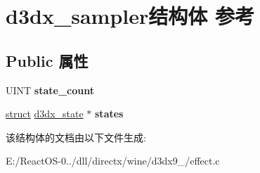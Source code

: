\hypertarget{structd3dx__sampler}{}\section{d3dx\+\_\+sampler结构体 参考}
\label{structd3dx__sampler}
\subsection*{Public 属性}
\begin{DoxyCompactItemize}
\item 
\mbox{\label{structd3dx__sampler_a94d562f4ae8345b3c162ce1c12b115a8}} 
U\+I\+NT {\bfseries state\+\_\+count}
\item 
\mbox{\label{structd3dx__sampler_a3f8ee8c189eadeaf429f5736136c44c3}} 
\hyperlink{interfacestruct}{struct} \hyperlink{structd3dx__state}{d3dx\+\_\+state} $\ast$ {\bfseries states}
\end{DoxyCompactItemize}


该结构体的文档由以下文件生成\+:\begin{DoxyCompactItemize}
\item 
E\+:/\+React\+O\+S-\/0../dll/directx/wine/d3dx9\+\_/effect.\+c\end{DoxyCompactItemize}
